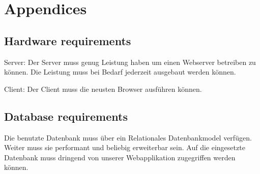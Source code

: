 \chapter{Appendices}

\section{Hardware requirements}
Server:
Der Server muss genug Leistung haben um einen Webserver betreiben zu können. Die Leistung muss bei Bedarf jederzeit ausgebaut werden können.

Client:
Der Client muss die neusten Browser ausführen können.


\section{Database requirements}
Die benutzte Datenbank muss über ein Relationales Datenbankmodel verfügen. Weiter muss sie performant und beliebig erweiterbar sein. Auf die eingesetzte Datenbank muss dringend von unserer Webapplikation zugegriffen werden können.
